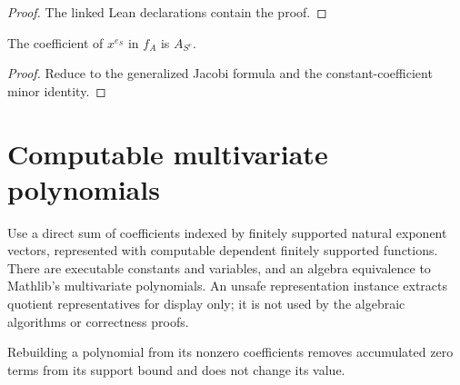 \begin{proof}

\leanok

The linked Lean declarations contain the proof.

\end{proof}

\begin{lemma}

\label{lem:coeff-via-derivative}


\leanok


The coefficient of $x^{e_S}$ in $f_A$ is $A_{S^c}$.
\end{lemma}

\begin{proof}

\leanok

Reduce to the generalized Jacobi formula and the constant-coefficient minor identity.

\end{proof}

\section{Computable multivariate polynomials}

\begin{definition}

\label{def:computable}


\leanok

Use a direct sum of coefficients indexed by finitely supported natural exponent vectors,
represented with computable dependent finitely supported functions. There are executable
constants and variables, and an algebra equivalence to Mathlib's multivariate polynomials.
An unsafe representation instance extracts quotient representatives for display only;
it is not used by the algebraic algorithms or correctness proofs.

\end{definition}

\begin{lemma}[Normalization]

\label{lem:normalize}


\leanok


Rebuilding a polynomial from its nonzero coefficients removes accumulated zero terms
from its support bound and does not change its value.

\end{lemma}

